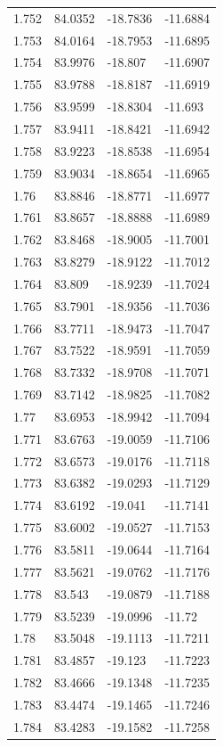 \begin{tabular}{llll}
1.752 & 84.0352 & -18.7836 & -11.6884 \\
1.753 & 84.0164 & -18.7953 & -11.6895 \\
1.754 & 83.9976 & -18.807 & -11.6907 \\
1.755 & 83.9788 & -18.8187 & -11.6919 \\
1.756 & 83.9599 & -18.8304 & -11.693 \\
1.757 & 83.9411 & -18.8421 & -11.6942 \\
1.758 & 83.9223 & -18.8538 & -11.6954 \\
1.759 & 83.9034 & -18.8654 & -11.6965 \\
1.76 & 83.8846 & -18.8771 & -11.6977 \\
1.761 & 83.8657 & -18.8888 & -11.6989 \\
1.762 & 83.8468 & -18.9005 & -11.7001 \\
1.763 & 83.8279 & -18.9122 & -11.7012 \\
1.764 & 83.809 & -18.9239 & -11.7024 \\
1.765 & 83.7901 & -18.9356 & -11.7036 \\
1.766 & 83.7711 & -18.9473 & -11.7047 \\
1.767 & 83.7522 & -18.9591 & -11.7059 \\
1.768 & 83.7332 & -18.9708 & -11.7071 \\
1.769 & 83.7142 & -18.9825 & -11.7082 \\
1.77 & 83.6953 & -18.9942 & -11.7094 \\
1.771 & 83.6763 & -19.0059 & -11.7106 \\
1.772 & 83.6573 & -19.0176 & -11.7118 \\
1.773 & 83.6382 & -19.0293 & -11.7129 \\
1.774 & 83.6192 & -19.041 & -11.7141 \\
1.775 & 83.6002 & -19.0527 & -11.7153 \\
1.776 & 83.5811 & -19.0644 & -11.7164 \\
1.777 & 83.5621 & -19.0762 & -11.7176 \\
1.778 & 83.543 & -19.0879 & -11.7188 \\
1.779 & 83.5239 & -19.0996 & -11.72 \\
1.78 & 83.5048 & -19.1113 & -11.7211 \\
1.781 & 83.4857 & -19.123 & -11.7223 \\
1.782 & 83.4666 & -19.1348 & -11.7235 \\
1.783 & 83.4474 & -19.1465 & -11.7246 \\
1.784 & 83.4283 & -19.1582 & -11.7258 \\

\end{tabular}
